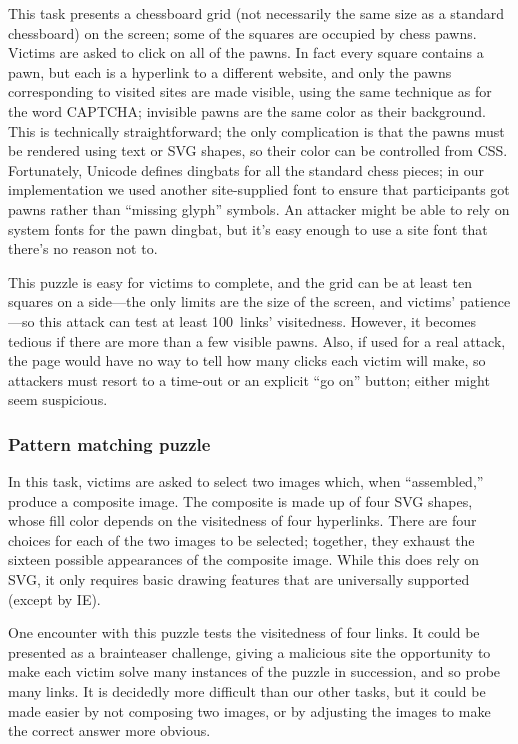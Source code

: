 \documentclass[conference]{IEEEtran}
\begin{document}
This task presents a chessboard grid (not necessarily the same size as
a standard chessboard) on the screen; some of the squares are occupied
by chess pawns.  Victims are asked to click on all of the pawns.  In
fact every square contains a pawn, but each is a hyperlink to a
different website, and only the pawns corresponding to visited sites
are made visible, using the same technique as for the word CAPTCHA;
invisible pawns are the same color as their background.  This is
technically straightforward; the only complication is that the pawns
must be rendered using text or SVG shapes, so their color can be
controlled from CSS.  Fortunately, Unicode defines dingbats for all
the standard chess pieces; in our implementation we used another
site-supplied font to ensure that participants got pawns rather than
“missing glyph” symbols.  An attacker might be able to rely on system
fonts for the pawn dingbat, but it's easy enough to use a site font
that there's no reason not to.

This puzzle is easy for victims to complete, and the grid can be at
least ten squares on a side---the only limits are the size of the
screen, and victims' patience---so this attack can test at least
100~links' visitedness.  However, it becomes tedious if there are more
than a few visible pawns.  Also, if used for a real attack, the page
would have no way to tell how many clicks each victim will make, so
attackers must resort to a time-out or an explicit “go on” button;
either might seem suspicious.

\subsubsection{Pattern matching puzzle}

In this task, victims are asked to select two images which, when
“assembled,” produce a composite image.  The composite is made up of
four SVG shapes, whose fill color depends on the visitedness of four
hyperlinks.  There are four choices for each of the two images to be
selected; together, they exhaust the sixteen possible appearances of
the composite image.  While this does rely on SVG, it only requires
basic drawing features that are universally supported (except by IE).

One encounter with this puzzle tests the visitedness of four links.
It could be presented as a brainteaser challenge, giving a malicious
site the opportunity to make each victim solve many instances of the
puzzle in succession, and so probe many links.  It is decidedly more
difficult than our other tasks, but it could be made easier by not
composing two images, or by adjusting the images to make the correct
answer more obvious.
\end{document}
